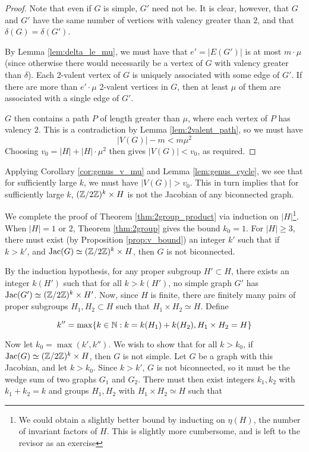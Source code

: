 \documentclass{amsart}
\begin{document}
\begin{proof}
  Note that even if $G$ is simple, $G'$ need not be. It is clear,
  however, that $G$ and $G'$ have the same number of vertices with
  valency greater than $2$, and that $\delta(G) = \delta(G')$.

  By Lemma \ref{lem:delta_le_mu}, we must have that $e' = |E(G')|$ is
  at most $m \cdot \mu$ (since otherwise there would necessarily be a
  vertex of $G$ with valency greater than $\delta$). Each 2-valent
  vertex of $G$ is uniquely associated with some edge of $G'$. If
  there are more than $e' \cdot \mu$ 2-valent vertices in $G$, then at
  least $\mu$ of them are associated with a single edge of $G'$. 

  $G$ then contains a path $P$ of length greater than $\mu$, where
  each vertex of $P$ has valency $2$. This is a contradiction by Lemma
  \ref{lem:2valent_path}, so we must have 
  \[
  |V(G)| - m < m\mu^2
  \] 
  Choosing $v_0 = |H| + |H| \cdot \mu^2$ then gives $|V(G)| < v_0$, as
  required.
\end{proof}

Applying Corollary \ref{cor:genus_v_mu} and Lemma
\ref{lem:genus_cycle}, we see that for sufficiently large $k$, we must
have $|V(G)| > v_0$. This in turn implies that for sufficiently large
$k$, $(\mathbb{Z}/2\mathbb{Z})^k \times H$ is not the Jacobian of any biconnected
graph.

We complete the proof of Theorem \ref{thm:2group_product} via
induction on $|H|$\footnote{We could obtain a slightly better bound by
  inducting on $\eta(H)$, the number of invariant factors of $H$. This
  is slightly more cumbersome, and is left to the revisor as an
  exercise}. When $|H| = 1$ or $2$, Theorem \ref{thm:2group} gives the
bound $k_0 = 1$. For $|H| \ge 3$, there must exist (by Proposition
\ref{prop:v_bound}) an integer $k'$ such that if $k > k'$, and
$\operatorname{Jac}(G) \simeq (\mathbb{Z}/2\mathbb{Z})^k \times H$, then $G$ is not biconnected.

By the induction hypothesis, for any proper subgroup $H' \subset H$,
there exists an integer $k(H')$ such that for all $k > k(H')$, no
simple graph $G'$ has $\operatorname{Jac}(G') \simeq (\mathbb{Z}/2\mathbb{Z})^k \times H'$. Now,
since $H$ is finite, there are finitely many pairs of proper subgroups
$H_1, H_2 \subset H$ such that $H_1 \times H_2 \simeq H$. Define

\begin{equation}
  k'' = \max\{k \in \mathbb{N} : k = k(H_1) + k(H_2), H_1 \times H_2 = H\}
\end{equation}

Now let $k_0 = \max(k', k'')$. We wish to show that for all $k > k_0$,
if $\operatorname{Jac}(G) \simeq (\mathbb{Z}/2\mathbb{Z})^k \times H$, then $G$ is not simple. Let
$G$ be a graph with this Jacobian, and let $k > k_0$.  Since $k > k'$,
$G$ is not biconnected, so it must be the wedge sum of two graphs
$G_1$ and $G_2$. There must then exist integers $k_1, k_2$ with $k_1 +
k_2 = k$ and groups $H_1, H_2$ with $H_1 \times H_2 \simeq H$ such
that
\end{document}
